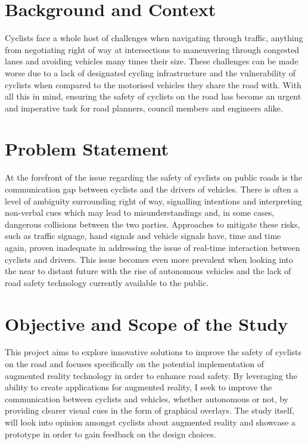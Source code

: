 \documentclass{l4proj}
\begin{document}
\section{Background and Context}
Cyclists face a whole host of challenges when navigating through traffic, anything from negotiating right of way at intersections to maneuvering through congested lanes and avoiding vehicles many times their size. These challenges can be made worse due to a lack of designated cycling infrastructure and the vulnerability of cyclists when compared to the motorised vehicles they share the road with. With all this in mind, ensuring the safety of cyclists on the road has become an urgent and imperative task for road planners, council members and engineers alike.

\section{Problem Statement}
At the forefront of the issue regarding the safety of cyclists on public roads is the communication gap between cyclists and the drivers of vehicles. There is often a level of ambiguity surrounding right of way, signalling intentions and interpreting non-verbal cues which may lead to misunderstandings and, in some cases, dangerous collisions between the two parties. Approaches to mitigate these risks, such as traffic signage, hand signals and vehicle signals have, time and time again, proven inadequate in addressing the issue of real-time interaction between cyclists and drivers. This issue becomes even more prevalent when looking into the near to distant future with the rise of autonomous vehicles and the lack of road safety technology currently available to the public.

\section{Objective and Scope of the Study}
This project aims to explore innovative solutions to improve the safety of cyclists on the road and focuses specifically on the potential implementation of augmented reality technology in order to enhance road safety. By leveraging the ability to create applications for augmented reality, I seek to improve the communication between cyclists and vehicles, whether autonomous or not, by providing clearer visual cues in the form of graphical overlays. The study itself, will look into opinion amongst cyclists about augmented reality and showcase a prototype in order to gain feedback on the design choices.
\end{document}
